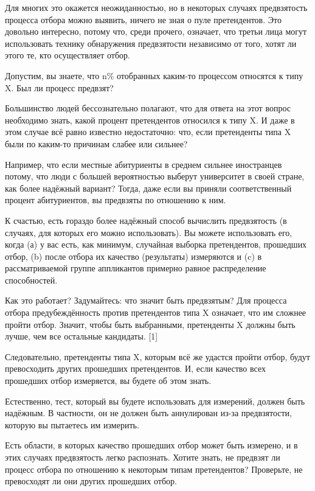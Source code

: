 \documentclass[ebook,12pt,oneside,openany]{memoir}
\date{}
\begin{document}
\maketitle

Для многих это окажется неожиданностью, но в некоторых случаях
предвзятость процесса отбора можно выявить, ничего не зная о пуле
претендентов. Это довольно интересно, потому что, среди прочего,
означает, что третьи лица могут использовать технику обнаружения
предвзятости независимо от того, хотят ли этого те, кто осуществляет
отбор.

Допустим, вы знаете, что n\% отобранных каким-то процессом относятся к
типу X. Был ли процесс предвзят?

Большинство людей бессознательно полагают, что для ответа на этот
вопрос необходимо знать, какой процент претендентов относился к типу
X. И даже в этом случае всё равно известно недостаточно: что, если
претенденты типа X были по каким-то причинам слабее или сильнее?

Например, что если местные абитуриенты в среднем сильнее иностранцев
потому, что люди с большей вероятностью выберут университет в своей
стране, как более надёжный вариант? Тогда, даже если вы приняли
соответственный процент абитуриентов, вы предвзяты по отношению к ним.

К счастью, есть гораздо более надёжный способ вычислить предвзятость
(в случаях, для которых его можно использовать). Вы можете
использовать его, когда (а) у вас есть, как минимум, случайная выборка
претендентов, прошедших отбор, (b) после отбора их качество
(результаты) измеряются и (c) в рассматриваемой группе аппликантов
примерно равное распределение способностей.

Как это работает? Задумайтесь: что значит быть предвзятым? Для
процесса отбора предубеждённость против претендентов типа X означает,
что им сложнее пройти отбор. Значит, чтобы быть выбранными,
претенденты X должны быть лучше, чем все остальные кандидаты. [1]

Следовательно, претенденты типа X, которым всё же удастся пройти
отбор, будут превосходить других прошедших претендентов. И, если
качество всех прошедших отбор измеряется, вы будете об этом знать.

Естественно, тест, который вы будете использовать для измерений,
должен быть надёжным. В частности, он не должен быть аннулирован из-за
предвзятости, которую вы пытаетесь им измерить.

Есть области, в которых качество прошедших отбор может быть измерено,
и в этих случаях предвзятость легко распознать. Хотите знать, не
предвзят ли процесс отбора по отношению к некоторым типам
претендентов? Проверьте, не превосходят ли они других прошедших отбор.
\end{document}
